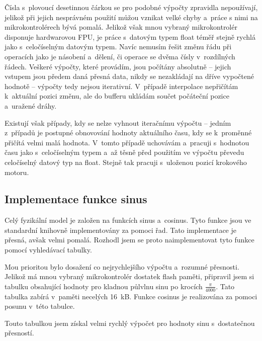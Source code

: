 		Čísla s~plovoucí desetinnou čárkou se pro podobné výpočty zpravidla nepoužívají, jelikož při jejich nesprávném použití můžou vznikat velké chyby a~práce s nimi na mikrokontrolérech bývá pomalá. Jelikož však mnou vybraný mikrokontrolér disponuje hardwarovou FPU, je práce s~datovým typem float téměř stejně rychlá jako s~celočíselným datovým typem. Navíc nemusím řešit změnu řádu při operacích jako je násobení a~dělení, či operace se dvěma čísly v~rozdílných řádech. Veškeré výpočty, které provádím, jsou počítány absolutně -- jejich vstupem jsou předem daná přesná data, nikdy se nezakládají na dříve vypočtené hodnotě -- výpočty tedy nejsou iterativní. V~případě interpolace nepřičítám k~aktuální pozici změnu, ale do bufferu ukládám součet počáteční pozice a~uražené dráhy.
		
		Existují však případy, kdy se nelze vyhnout iteračnímu výpočtu -- jedním z~případů je postupné obnovování hodnoty aktuálního času, kdy se k~proměnné přičítá velmi malá hodnota. V~tomto případě uchovávám a~pracuji s~hodnotou času jako s~celočíselným typem a~až těsně před použitím ve výpočtu převedu celočíselný datový typ na float. Stejně tak pracuji s~uloženou pozicí krokového motoru.
		
		\subsection{Implementace funkce sinus}
		
		Celý fyzikální model je založen na funkcích sinus a~cosinus. Tyto funkce jsou ve standardní knihovně implementovány za pomoci řad. Tato implementace je přesná, avšak velmi pomalá. Rozhodl jsem se proto naimplementovat tyto funkce pomocí vyhledávací tabulky.
		
		Mou prioritou bylo dosažení co nejrychlejšího výpočtu a~rozumné přesnosti. Jelikož má mnou vybraný mikrokontrolér dostatek flash paměti, připravil jsem si tabulku obsahující hodnoty pro kladnou půlvlnu sinu po krocích $\frac{\pi}{4000}$. Tato tabulka zabírá v~paměti necelých 16~kB.	Funkce cosinus je realizována za pomoci posunu v~této tabulce.
		
		Touto tabulkou jsem získal velmi rychlý výpočet pro hodnoty sinu s~dostatečnou přesností.
	
